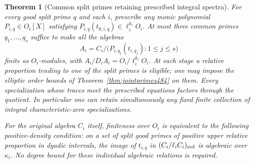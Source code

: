 \documentclass[a4paper,11pt]{article}
\newtheorem{theorem}[proposition]{Theorem}
\theoremstyle{definition}
\theoremstyle{remark}
\numberwithin{equation}{section}
\begin{document}
\begin{theorem}[Common split primes retaining prescribed integral spectra]\leavevmode
\label{thm:spectralquot499}
For every good split prime \(q\) and each \(i\), prescribe any
monic polynomial \(P_{i,q}\in O_i[X]\) satisfying
\(P_{i,q}(t_{0,i,q})\in\ell_i^{k_i}O_i\).
At most three common primes \(q_1,\ldots,q_s\) suffice to make
all the algebras
\[
 A_i=C_i/\big(P_{i,q_j}(t_{i,q_j}):1\le j\le s\big)
\]
finite as \(O_i\)-modules, with
\(A_i/D_iA_i=O_i/\ell_i^{k_i}O_i\). At each stage a relative
proportion tending to one of the split primes is eligible;
one may impose the elliptic order bounds of
Theorem~\ref{thm:jointprimes484} on them. Every specialization
whose traces meet the prescribed equations factors through
the quotient. In particular one can retain simultaneously any
fixed finite collection of integral characteristic-zero
specializations.

For the original algebra \(C_i\) itself, finiteness over \(O_i\)
is equivalent to the following positive-density condition:
on a set of split good primes of positive upper relative
proportion in dyadic intervals, the image of \(t_{i,q}\) in
\((C_i/\ell_i C_i)_{\rm red}\) is algebraic over \(\kappa_i\).
No degree bound for these individual algebraic relations
is required.
\end{theorem}
\end{document}
